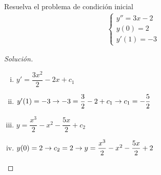 \begin{resuelto}
	Resuelva el problema de condición inicial
	\begin{align}
		\begin{cases}
			y''=3x-2\\
			y(0)=2\\
			y'(1)=-3
		\end{cases}
	\end{align}
\end{resuelto}



\begin{proof}[Solución]
	\begin{enumerate}[(i)]
		\item $y'=\dfrac{3x^{2}}{2}-2x+c_{1}$
		\item $y'(1)=-3\rightarrow
		-3=\dfrac{3}{2}-2+c_{1} \rightarrow
		c_{1}=-\dfrac{5}{2}$
		\item $y= \dfrac{x^{3}}{2}-x^{2}-\dfrac{5x}{2}+c_2$
		\item
		$y(0)=2\rightarrow
		c_{2}=2 \rightarrow
		y = \dfrac{x^{3}}{2}-x^{2}-\dfrac{5x}{2}+2$
	\end{enumerate}
\end{proof}


